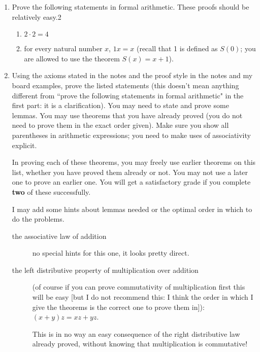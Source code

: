 \documentclass[12pt]{article}
\begin{document}
\begin{enumerate}

\item Prove  the following statements in formal arithmetic.  These proofs should be relatively easy.2

\begin{enumerate}

\item $2 \cdot 2=4$

\item for every natural number $x$, $1x = x$ (recall that 1 is defined as $S(0)$; you are allowed to use the theorem $S(x)=x+1$).


\end{enumerate}

\item Using the axioms stated in the notes and the proof style in the notes and my board examples, prove the listed statements (this doesn't mean anything different from ``prove the following statements in formal arithmetic" in the first part:  it is a clarification).   You may need to state and prove some lemmas.  You may use theorems that you have already proved (you do not need to prove them in the exact order given).  Make sure you show all parentheses in arithmetic expressions; you need to make uses of associativity explicit.

In proving each of these theorems, you may freely use earlier theorems on this list, whether you have proved them already or not.   You may not use a later one to prove an earlier one.  You will get a satisfactory grade if you complete {\bf two} of these successfully.

I may add some hints about lemmas needed or the optimal order in which to do the problems.

\begin{description}

\item  [the associative law of addition]

no special hints for this one, it looks pretty direct.

\item  [the left distributive property of multiplication  over addition] (of course if you can prove commutativity of multiplication first this will be easy [but I do not recommend this:  I think the order in which I give the theorems is the correct one to prove them in]):
$(x+y)z = xz+yz$.

This is in no way an easy consequence of the right distributive law already proved, without knowing that multiplication is commutative!


\end{description}
\end{enumerate}
\end{document}
